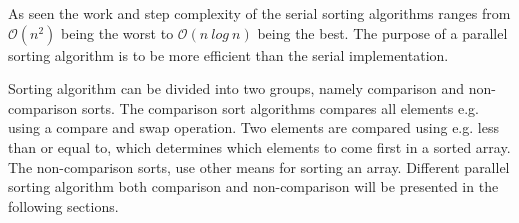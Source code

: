 As seen the work and step complexity of the serial sorting algorithms ranges from $\mathcal{O}(n^2)$ being the worst to $\mathcal{O}(n~log~n)$ being the best. The purpose of a parallel sorting algorithm is to be more efficient than the serial implementation.

Sorting algorithm can be divided into two groups, namely comparison and non-comparison sorts. The comparison sort algorithms compares all elements e.g. using a compare and swap operation. Two elements are compared using e.g. less than or equal to, which determines which elements to come first in a sorted array. The non-comparison sorts, use other means for sorting an array. Different parallel sorting algorithm both comparison and non-comparison will be presented in the following sections. 